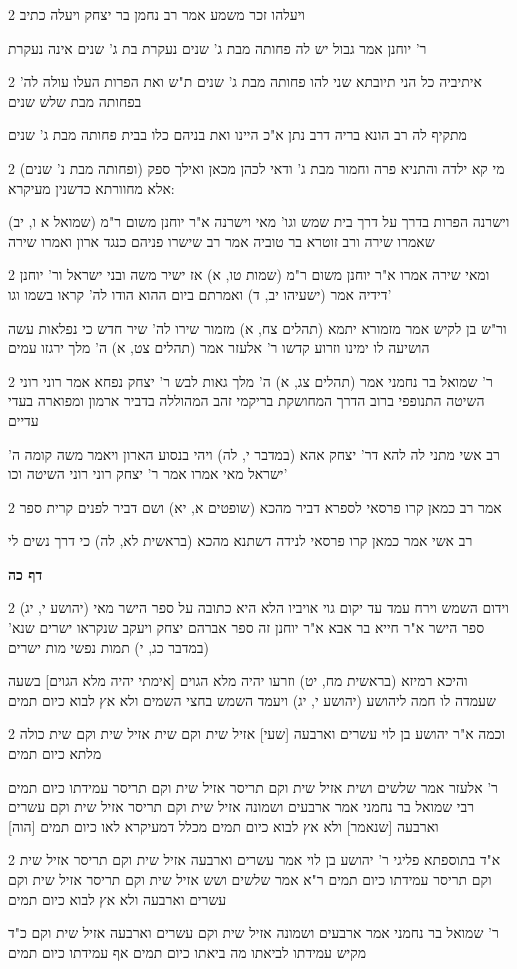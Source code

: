 \documentclass[12pt, openany]{book}
\newcommand{\sethebfont}{
\fontsize{10.5pt}{21.0pt} \selectfont
}
\newcommand{\twocol}[1]{
	{\sethebfont \begin{multicols}{2}
			#1
	\end{multicols}}	
}
\newcommand{\sectname}{}
\newcommand{\newsection}[1]{
	\addcontentsline{toc}{section}{#1}
	\renewcommand{\sectname}{#1}	
	\vspace{-\baselineskip}
	\begin{center}
		\textbf{%
\fontsize{16pt}{16pt}\selectfont
			#1}
	\end{center}
	\vspace{-\baselineskip}
	\nopagebreak
}
\begin{document}
\twocol{ויעלהו זכר משמע אמר רב נחמן בר יצחק ויעלה כתיב
\par ר' יוחנן אמר גבול יש לה פחותה מבת ג' שנים נעקרת בת ג' שנים אינה נעקרת}
\twocol{איתיביה כל הני תיובתא שני להו פחותה מבת ג' שנים ת"ש ואת הפרות העלו עולה לה' בפחותה מבת שלש שנים
\par מתקיף לה רב הונא בריה דרב נתן א"כ היינו ואת בניהם כלו בבית פחותה מבת ג' שנים}
\twocol{(ופחותה מבת נ' שנים) מי קא ילדה והתניא פרה וחמור מבת ג' ודאי לכהן מכאן ואילך ספק אלא מחוורתא כדשנין מעיקרא:
\par (שמואל א ו, יב) וישרנה הפרות בדרך על דרך בית שמש וגו' מאי וישרנה א"ר יוחנן משום ר"מ שאמרו שירה ורב זוטרא בר טוביה אמר רב שישרו פניהם כנגד ארון ואמרו שירה}
\twocol{ומאי שירה אמרו א"ר יוחנן משום ר"מ (שמות טו, א) אז ישיר משה ובני ישראל ור' יוחנן דידיה אמר (ישעיהו יב, ד) ואמרתם ביום ההוא הודו לה' קראו בשמו וגו'
\par ור"ש בן לקיש אמר מזמורא יתמא (תהלים צח, א) מזמור שירו לה' שיר חדש כי נפלאות עשה הושיעה לו ימינו וזרוע קדשו ר' אלעזר אמר (תהלים צט, א) ה' מלך ירגזו עמים}
\twocol{ר' שמואל בר נחמני אמר (תהלים צג, א) ה' מלך גאות לבש ר' יצחק נפחא אמר רוני רוני השיטה התנופפי ברוב הדרך המחושקת בריקמי זהב המהוללה בדביר ארמון ומפוארה בעדי עדיים
\par רב אשי מתני לה להא דר' יצחק אהא (במדבר י, לה) ויהי בנסוע הארון ויאמר משה קומה ה' ישראל מאי אמרו אמר ר' יצחק רוני רוני השיטה וכו'}
\twocol{אמר רב כמאן קרו פרסאי לספרא דביר מהכא (שופטים א, יא) ושם דביר לפנים קרית ספר
\par רב אשי אמר כמאן קרו פרסאי לנידה דשתנא מהכא (בראשית לא, לה) כי דרך נשים לי}
\newsection{דף כה}
\twocol{(יהושע י, יג) וידום השמש וירח עמד עד יקום גוי אויביו הלא היא כתובה על ספר הישר מאי ספר הישר א"ר חייא בר אבא א"ר יוחנן זה ספר אברהם יצחק ויעקב שנקראו ישרים שנא' (במדבר כג, י) תמות נפשי מות ישרים
\par והיכא רמיזא (בראשית מח, יט) וזרעו יהיה מלא הגוים [אימתי יהיה מלא הגוים] בשעה שעמדה לו חמה ליהושע (יהושע י, יג) ויעמד השמש בחצי השמים ולא אץ לבוא כיום תמים}
\twocol{וכמה א"ר יהושע בן לוי עשרים וארבעה [שעי] אזיל שית וקם שית אזיל שית וקם שית כולה מלתא כיום תמים
\par ר' אלעזר אמר שלשים ושית אזיל שית וקם תריסר אזיל שית וקם תריסר עמידתו כיום תמים רבי שמואל בר נחמני אמר ארבעים ושמונה אזיל שית וקם תריסר אזיל שית וקם עשרים וארבעה [שנאמר] ולא אץ לבוא כיום תמים מכלל דמעיקרא לאו כיום תמים [הוה]}
\twocol{א"ד בתוספתא פליגי ר' יהושע בן לוי אמר עשרים וארבעה אזיל שית וקם תריסר אזיל שית וקם תריסר עמידתו כיום תמים ר"א אמר שלשים ושש אזיל שית וקם תריסר אזיל שית וקם עשרים וארבעה ולא אץ לבוא כיום תמים
\par ר' שמואל בר נחמני אמר ארבעים ושמונה אזיל שית וקם עשרים וארבעה אזיל שית וקם כ"ד מקיש עמידתו לביאתו מה ביאתו כיום תמים אף עמידתו כיום תמים}
\end{document}
